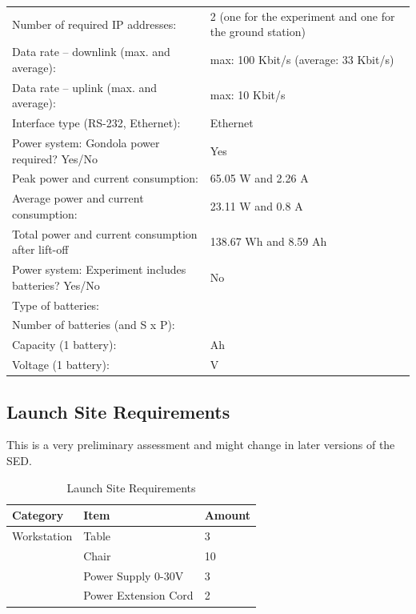 \documentclass[ %
  a4paper, %
  11pt, %
  openany, %
  parskip, %
  toc=totoc, %
  listof=totoc, %
  bibliography=totoc %
]{scrreprt} %
\providecommand{\DIFdelbegin}{} %
\providecommand{\DIFaddbeginFL}{} %
\providecommand{\DIFaddendFL}{} %
\providecommand{\DIFdelendFL}{} %
\providecommand{\DIFscaledelfig}{0.5}
\newlength{\DIFdelgraphicswidth} %
\newlength{\DIFdelgraphicsheight} %
\providecommand{\DIFaddincludegraphics}[2][]{{\color{blue}\fbox{\DIFOincludegraphics[#1]{#2}}}} %
\providecommand{\DIFdelincludegraphics}[2][]{%
\sbox{\DIFdelgraphicsbox}{\DIFOincludegraphics[#1]{#2}}%
\settoboxwidth{\DIFdelgraphicswidth}{\DIFdelgraphicsbox} %
\settoboxtotalheight{\DIFdelgraphicsheight}{\DIFdelgraphicsbox} %
\scalebox{\DIFscaledelfig}{%
\parbox[b]{\DIFdelgraphicswidth}{\usebox{\DIFdelgraphicsbox}\\[-\baselineskip] \rule{\DIFdelgraphicswidth}{0em}}\llap{\resizebox{\DIFdelgraphicswidth}{\DIFdelgraphicsheight}{%
\setlength{\unitlength}{\DIFdelgraphicswidth}%
\begin{picture}(1,1)%
\thicklines\linethickness{2pt} %
{\color[rgb]{1,0,0}\put(0,0){\framebox(1,1){}}}%
{\color[rgb]{1,0,0}\put(0,0){\line( 1,1){1}}}%
{\color[rgb]{1,0,0}\put(0,1){\line(1,-1){1}}}%
\end{picture}%
}\hspace*{3pt}}} %
} %
\DeclareRobustCommand{\DIFdelbegin}{\DIFOdelbegin \let\includegraphics\DIFdelincludegraphics} %
\DeclareRobustCommand{\DIFaddbeginFL}{\DIFOaddbeginFL \let\includegraphics\DIFaddincludegraphics} %
\DeclareRobustCommand{\DIFaddendFL}{\DIFOaddendFL \let\includegraphics\DIFOincludegraphics} %
\DeclareRobustCommand{\DIFdelendFL}{\DIFOaddendFL \let\includegraphics\DIFOincludegraphics} %
\begin{document}
\begin{table}[htbp]
\begin{tabular}{p{10cm} p{5cm}}
Number of required IP addresses: & 2 (one for the experiment and one for the ground station)\\
Data rate -- downlink (max. and average): & max: 100 Kbit/s  (average: 33 Kbit/s) \\
Data rate -- uplink (max. and average): & max: 10 Kbit/s \\
Interface type (RS-232, Ethernet): & Ethernet \\
\midrule
Power system: Gondola power required? Yes/No & Yes\\
Peak power and current consumption: & 65.05 W and 2.26 A \\
Average power and current consumption: & 23.11 W and 0.8 A \\
Total power and current consumption after lift-off & 138.67 Wh and 8.59 Ah \\
\midrule
Power system: Experiment includes batteries? Yes/No & No\\
Type of batteries: & \\
Number of batteries (and S x P): & \\
Capacity (1 battery): & Ah \\
Voltage (1 battery): & V \\
\bottomrule
\end{tabular}
\DIFaddendFL \end{table}
\clearpage

\subsection{Launch Site Requirements}
This is a very preliminary assessment and might change in later versions of the SED.
\DIFdelbegin %
\DIFdelendFL \DIFaddbeginFL \begin{table}[htbp]
\DIFaddendFL \centering
\caption{Launch Site Requirements}
\label{tab:launch_site_req}
\begin{tabular}{lll}
\toprule
\textbf{Category} & \textbf{Item} & \textbf{Amount} \\
\midrule
Workstation&Table & 3 \\
 &Chair & 10 \\
 &Power Supply 0-30V & 3\\
 &Power Extension Cord & 2 \\

\bottomrule
\end{tabular}
\end{table}
\clearpage
\end{document}
